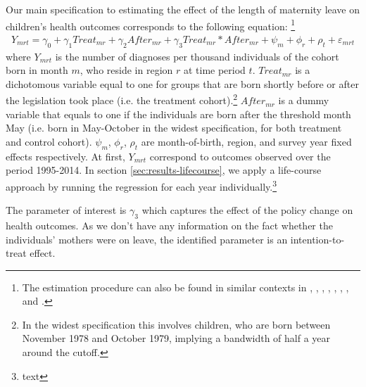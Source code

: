 \documentclass[11pt, a4paper,draft]{article} %
\begin{document}
Our main specification to estimating the effect of the length of maternity leave on children's health outcomes corresponds to the following equation: \footnote{The estimation procedure can also be found in similar contexts in \cite{RafaelLaliveandJosefZweimuller2009}, \cite{Dustmann2012}, \cite{Ekberg2013}, \cite{schonberg2014expansions}, \cite{Lalive2014}, \cite{Huebener2017}, \cite{danzer2017}, and \cite{guertzgen2018}.}
\begin{align}
Y_{mrt} = \gamma_0 + \gamma_1 Treat_{mr} + \gamma_2 After_{mr} + \gamma_3 Treat_{mr} * After_{mr} + \psi_m + \phi_r + \rho_t + \varepsilon_{mrt}
\end{align}
where $Y_{mrt}$ is the number of diagnoses per thousand individuals of the cohort born in month $m$, who reside in region $r$ at time period $t$. $Treat_{mr}$ is a dichotomous variable equal to one for groups that are born shortly before or after the legislation took place (i.e. the treatment cohort).\footnote{In the widest specification this involves children, who are born between November 1978 and October 1979, implying a bandwidth of half a year around the cutoff.} $After_{mr}$ is a dummy variable that equals to one if the individuals are born after the threshold month May (i.e. born in May-October in the widest specification, for both treatment and control cohort). $\psi_m$, $\phi_r$, $\rho_t$ are month-of-birth, region, and survey year fixed effects respectively. At first, $Y_{mrt}$ correspond to outcomes observed over the period 1995-2014. In section \ref{sec:results-lifecourse}, we apply a life-course approach by running the regression for each year individually.\footnote{text} 


The parameter of interest is $\gamma_3$ which captures the effect of the policy change on health outcomes. As we don't have any information on the fact whether the individuals' mothers were on leave, the identified parameter is an intention-to-treat effect. \newline
\end{document}
